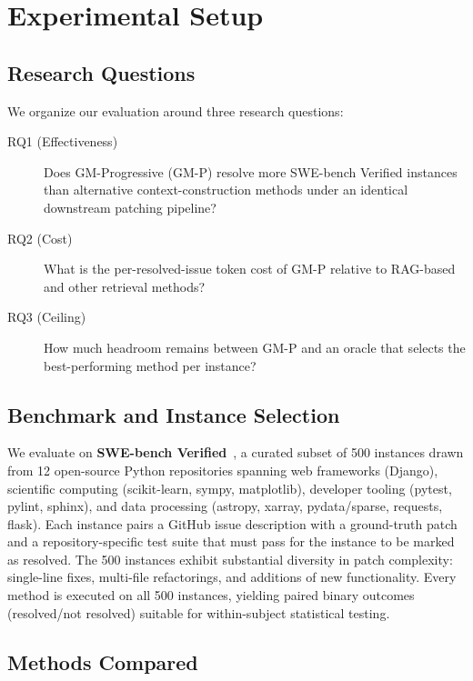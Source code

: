 \section{Experimental Setup}
\label{sec:setup}

\subsection{Research Questions}

We organize our evaluation around three research questions:

\begin{description}
    \item[RQ1 (Effectiveness)] Does GM-Progressive (GM-P) resolve more SWE-bench Verified instances than alternative context-construction methods under an identical downstream patching pipeline?
    \item[RQ2 (Cost)] What is the per-resolved-issue token cost of GM-P relative to RAG-based and other retrieval methods?
    \item[RQ3 (Ceiling)] How much headroom remains between GM-P and an oracle that selects the best-performing method per instance?
\end{description}

\subsection{Benchmark and Instance Selection}

We evaluate on \textbf{SWE-bench Verified}~\cite{jimenez2024swebench}, a curated subset of 500 instances drawn from 12 open-source Python repositories spanning web frameworks (Django), scientific computing (scikit-learn, sympy, matplotlib), developer tooling (pytest, pylint, sphinx), and data processing (astropy, xarray, pydata/sparse, requests, flask). Each instance pairs a GitHub issue description with a ground-truth patch and a repository-specific test suite that must pass for the instance to be marked as resolved. The 500 instances exhibit substantial diversity in patch complexity: single-line fixes, multi-file refactorings, and additions of new functionality. Every method is executed on all 500 instances, yielding paired binary outcomes (resolved/not resolved) suitable for within-subject statistical testing.

\subsection{Methods Compared}

